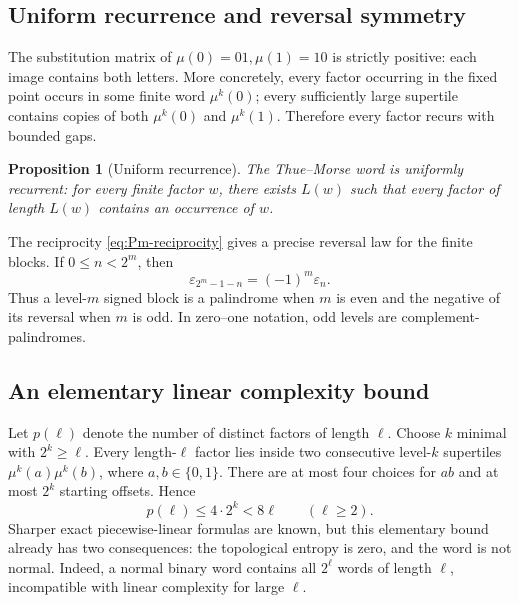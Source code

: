 \documentclass[11pt,oneside]{article}
\numberwithin{equation}{section}
\newtheorem{proposition}[theorem]{Proposition}
\theoremstyle{definition}
\theoremstyle{remark}
\newcommand{\eps}{\varepsilon}
\begin{document}
\subsection{Uniform recurrence and reversal symmetry}

The substitution matrix of \(\mu(0)=01,\mu(1)=10\) is strictly positive:
each image contains both letters.  More concretely, every factor occurring in
the fixed point occurs in some finite word \(\mu^k(0)\); every sufficiently
large supertile contains copies of both \(\mu^k(0)\) and \(\mu^k(1)\).
Therefore every factor recurs with bounded gaps.

\begin{proposition}[Uniform recurrence]
The Thue--Morse word is uniformly recurrent: for every finite factor \(w\),
there exists \(L(w)\) such that every factor of length \(L(w)\) contains an
occurrence of \(w\).
\end{proposition}

The reciprocity \eqref{eq:Pm-reciprocity} gives a precise reversal law for the
finite blocks.  If \(0\le n<2^m\), then
\begin{equation}
 \eps_{2^m-1-n}=(-1)^m\eps_n.
 \label{eq:block-reversal}
\end{equation}
Thus a level-\(m\) signed block is a palindrome when \(m\) is even and the
negative of its reversal when \(m\) is odd.  In zero--one notation, odd levels
are complement-palindromes.

\subsection{An elementary linear complexity bound}

Let \(p(\ell)\) denote the number of distinct factors of length \(\ell\).
Choose \(k\) minimal with \(2^k\ge\ell\).  Every length-\(\ell\) factor lies
inside two consecutive level-\(k\) supertiles
\(\mu^k(a)\mu^k(b)\), where \(a,b\in\{0,1\}\).  There are at most four
choices for \(ab\) and at most \(2^k\) starting offsets.  Hence
\begin{equation}
 \boxed{p(\ell)\le4\cdot2^k<8\ell\qquad(\ell\ge2).}
 \label{eq:complexity-bound}
\end{equation}
Sharper exact piecewise-linear formulas are known, but this elementary bound
already has two consequences: the topological entropy is zero, and the word
is not normal.  Indeed, a normal binary word contains all \(2^\ell\) words of
length \(\ell\), incompatible with linear complexity for large \(\ell\).
\end{document}

